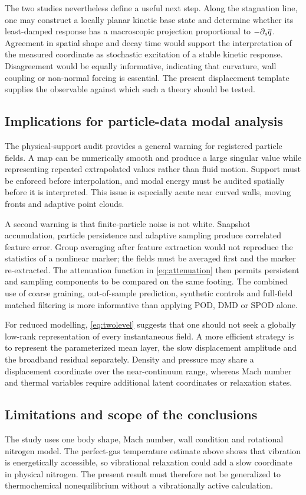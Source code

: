 The two studies nevertheless define a useful next step. Along the stagnation line, one may construct a locally planar kinetic base state and determine whether its least-damped response has a macroscopic projection proportional to $-\partial_s\overline{q}$. Agreement in spatial shape and decay time would support the interpretation of the measured coordinate as stochastic excitation of a stable kinetic response. Disagreement would be equally informative, indicating that curvature, wall coupling or non-normal forcing is essential. The present displacement template supplies the observable against which such a theory should be tested.

\subsection{Implications for particle-data modal analysis}
The physical-support audit provides a general warning for registered particle fields. A map can be numerically smooth and produce a large singular value while representing repeated extrapolated values rather than fluid motion. Support must be enforced before interpolation, and modal energy must be audited spatially before it is interpreted. This issue is especially acute near curved walls, moving fronts and adaptive point clouds.

A second warning is that finite-particle noise is not white. Snapshot accumulation, particle persistence and adaptive sampling produce correlated feature error. Group averaging after feature extraction would not reproduce the statistics of a nonlinear marker; the fields must be averaged first and the marker re-extracted. The attenuation function in \cref{eq:attenuation} then permits persistent and sampling components to be compared on the same footing. The combined use of coarse graining, out-of-sample prediction, synthetic controls and full-field matched filtering is more informative than applying POD, DMD or SPOD alone.

For reduced modelling, \cref{eq:twolevel} suggests that one should not seek a globally low-rank representation of every instantaneous field. A more efficient strategy is to represent the parameterized mean layer, the slow displacement amplitude and the broadband residual separately. Density and pressure may share a displacement coordinate over the near-continuum range, whereas Mach number and thermal variables require additional latent coordinates or relaxation states.

\subsection{Limitations and scope of the conclusions}
The study uses one body shape, Mach number, wall condition and rotational nitrogen model. The perfect-gas temperature estimate above shows that vibration is energetically accessible, so vibrational relaxation could add a slow coordinate in physical nitrogen. The present result must therefore not be generalized to thermochemical nonequilibrium without a vibrationally active calculation.

